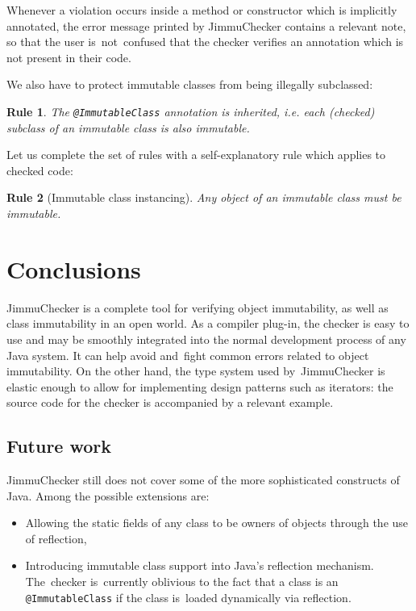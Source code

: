 \documentclass{pracamgr}
\theoremstyle{break}
\theoremstyle{break}
\theoremstyle{break}
\newtheorem{verrule}{Rule}
\begin{document}
Whenever a violation occurs inside a method or constructor which is
implicitly annotated, the error message printed by JimmuChecker 
contains a relevant note, so that the user is~not~confused that the
checker verifies an annotation which is not present in their code.

We also have to protect immutable classes from being illegally
subclassed: 
\begin{verrule}
  The \texttt{@ImmutableClass} annotation is inherited, i.e. each
  (checked) subclass of an immutable class is also immutable. 
\end{verrule}

Let us complete the set of rules with a self-explanatory rule which
applies to checked code:
\begin{verrule}[Immutable class instancing]
  Any object of an immutable class must be immutable. 
\end{verrule}

\section{Conclusions}

JimmuChecker is a complete tool for verifying object immutability, as
well as class immutability in an open world. As a compiler plug-in,
the checker is easy to use and may be smoothly integrated into the
normal development process of any Java system. It can help avoid
and~fight common errors related to object immutability. On the other
hand, the type system used by~JimmuChecker is elastic enough to allow
for implementing design patterns such as iterators: the source code
for the checker is accompanied by a relevant example.

\subsection{Future work}

JimmuChecker still does not cover some of the more sophisticated
constructs of Java. Among the possible extensions are:
\begin{itemize}
\item Allowing the static fields of any class to be owners of objects
  through the use of reflection, 
\item Introducing immutable class support into Java's reflection
  mechanism. The~checker is~currently oblivious to the fact that a
  class is an \texttt{@ImmutableClass} if the class is~loaded
  dynamically via reflection.
\end{itemize}
\end{document}
